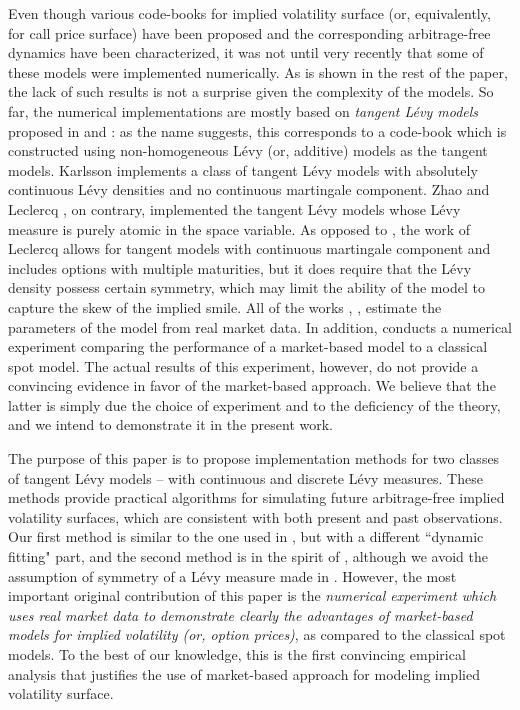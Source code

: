 \documentclass{article}
\numberwithin{equation}{section}
\begin{document}
Even though various code-books for implied volatility surface (or, equivalently, for call price surface) have been proposed and the corresponding arbitrage-free dynamics have been characterized, it was not until very recently that some of these models were implemented numerically. As is shown in the rest of the paper, the lack of such results is not a surprise given the complexity of the models. So far, the numerical implementations are mostly based on \emph{tangent L\'{e}vy models} proposed in \cite{carmona2010tangentlevy} and \cite{carmona2011tangentlevy}: as the name suggests, this corresponds to a code-book which is constructed using non-homogeneous L\'evy (or, additive) models as the tangent models. 
Karlsson \cite{karlsson2011consistent} implements a class of tangent L\'{e}vy models with absolutely continuous L\'evy densities and no continuous martingale component. Zhao \cite{Zhao2010dtl} and Leclercq \cite{emmanuel2014discrete}, on contrary, implemented the tangent L\'{e}vy models whose L\'{e}vy measure is purely atomic in the space variable. As opposed to \cite{Zhao2010dtl}, the work of Leclercq \cite{emmanuel2014discrete} allows for tangent models with continuous martingale component and includes options with multiple maturities, but it does require that the L\'evy density possess certain symmetry, which may limit the ability of the model to capture the skew of the implied smile. All of the works \cite{karlsson2011consistent}, \cite{Zhao2010dtl}, \cite{emmanuel2014discrete} estimate the parameters of the model from real market data. In addition, \cite{emmanuel2014discrete} conducts a numerical experiment comparing the performance of a market-based model to a classical spot model. The actual results of this experiment, however, do not provide a convincing evidence in favor of the market-based approach. We believe that the latter is simply due the choice of experiment and to the deficiency of the theory, and we intend to demonstrate it in the present work. 


The purpose of this paper is to propose implementation methods for two classes of tangent L\'{e}vy models -- with continuous and discrete L\'evy measures. These methods provide practical algorithms for simulating future arbitrage-free implied volatility surfaces, which are consistent with both present and past observations. Our first method is similar to the one used in \cite{karlsson2011consistent}, but with a different ``dynamic fitting" part, and the second method is in the spirit of \cite{emmanuel2014discrete}, although we avoid the assumption of symmetry of a L\'evy measure made in \cite{emmanuel2014discrete}. However, the most important original contribution of this paper is the \emph{numerical experiment which uses real market data to demonstrate clearly the advantages of market-based models for implied volatility (or, option prices)}, as compared to the classical spot models. To the best of our knowledge, this is the first convincing empirical analysis that justifies the use of market-based approach for modeling implied volatility surface.
\end{document}

